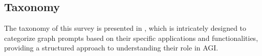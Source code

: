 





\subsection{Taxonomy}

The taxonomy of this survey is presented in , which is intricately designed to categorize graph prompts based on their specific applications and functionalities, providing a structured approach to understanding their role in AGI. 



